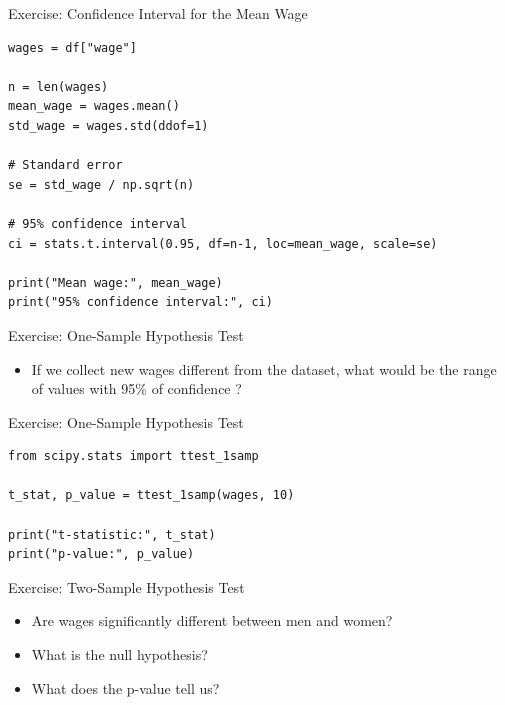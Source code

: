 \documentclass{beamer}
\begin{document}
\begin{frame}[fragile]{Exercise: Confidence Interval for the Mean Wage}

\begin{verbatim}
wages = df["wage"]

n = len(wages)
mean_wage = wages.mean()
std_wage = wages.std(ddof=1)

# Standard error
se = std_wage / np.sqrt(n)

# 95% confidence interval
ci = stats.t.interval(0.95, df=n-1, loc=mean_wage, scale=se)

print("Mean wage:", mean_wage)
print("95% confidence interval:", ci)
\end{verbatim}
    
\end{frame}

\begin{frame}[fragile]{Exercise: One-Sample Hypothesis Test}

\begin{itemize}
    \item If we collect new wages different from the dataset, what would be the range of values with 95\% of confidence ?
\end{itemize}
    
\end{frame}

\begin{frame}[fragile]{Exercise: One-Sample Hypothesis Test}

\begin{verbatim}
from scipy.stats import ttest_1samp

t_stat, p_value = ttest_1samp(wages, 10)

print("t-statistic:", t_stat)
print("p-value:", p_value)
\end{verbatim}

\end{frame}
\begin{frame}[fragile]{Exercise: Two-Sample Hypothesis Test}

\begin{itemize}
    \item Are wages significantly different between men and women?
    \item What is the null hypothesis?
    \item What does the p-value tell us?
\end{itemize}
    
\end{frame}
\end{document}
